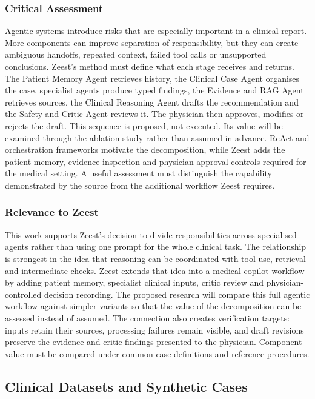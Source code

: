 \subsubsection{Critical Assessment}

Agentic systems introduce risks that are especially important in a clinical report. More components can improve separation of responsibility, but they can create ambiguous handoffs, repeated context, failed tool calls or unsupported conclusions. Zeest's method must define what each stage receives and returns. The Patient Memory Agent retrieves history, the Clinical Case Agent organises the case, specialist agents produce typed findings, the Evidence and RAG Agent retrieves sources, the Clinical Reasoning Agent drafts the recommendation and the Safety and Critic Agent reviews it. The physician then approves, modifies or rejects the draft. This sequence is proposed, not executed. Its value will be examined through the ablation study rather than assumed in advance. ReAct and orchestration frameworks motivate the decomposition, while Zeest adds the patient-memory, evidence-inspection and physician-approval controls required for the medical setting. A useful assessment must distinguish the capability demonstrated by the source from the additional workflow Zeest requires.

\subsubsection{Relevance to Zeest}

This work supports Zeest's decision to divide responsibilities across specialised agents rather than using one prompt for the whole clinical task. The relationship is strongest in the idea that reasoning can be coordinated with tool use, retrieval and intermediate checks. Zeest extends that idea into a medical copilot workflow by adding patient memory, specialist clinical inputs, critic review and physician-controlled decision recording. The proposed research will compare this full agentic workflow against simpler variants so that the value of the decomposition can be assessed instead of assumed. The connection also creates verification targets: inputs retain their sources, processing failures remain visible, and draft revisions preserve the evidence and critic findings presented to the physician. Component value must be compared under common case definitions and reference procedures.

\subsection{Clinical Datasets and Synthetic Cases}
